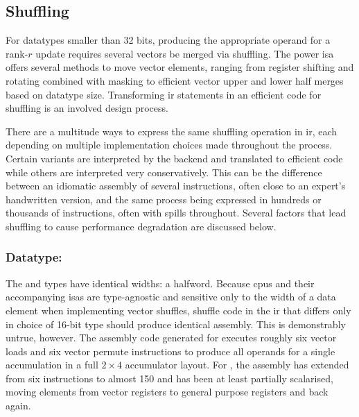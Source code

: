 \documentclass[\main/thesis.tex]{subfiles}
\begin{document}
\subsection{Shuffling}
For datatypes smaller than 32 bits, producing the appropriate operand for a rank-$r$ update requires several vectors be merged via shuffling.
The \gls{power} \gls{isa} offers several methods to move vector elements, ranging from register shifting and rotating combined with masking to efficient vector upper and lower half merges based on datatype size.
Transforming \gls{ir} statements in an efficient code for shuffling is an involved design process.

There are a multitude ways to express the same shuffling operation in \gls{ir}, each depending on multiple implementation choices made throughout the process.
Certain variants are interpreted by the backend and translated to efficient code while others are interpreted very conservatively.
This can be the difference between an idiomatic assembly of several instructions, often close to an expert's handwritten version, and the same process being expressed in hundreds or thousands of instructions, often with \glspl{spill} throughout.
Several factors that lead shuffling to cause performance degradation are discussed below.

\subsubsection{Datatype: \texorpdfstring{}{half}}
The  and  types have identical widths: a halfword.
Because \glspl{cpu} and their accompanying \glspl{isa} are type-agnostic and sensitive only to the width of a data element when implementing vector shuffles, shuffle code in the \gls{ir} that differs only in choice of 16-bit type should produce identical assembly.
This is demonstrably untrue, however.
The assembly code generated for  executes roughly six vector loads and six vector permute instructions to produce all operands for a single accumulation in a full $2 \times 4$ accumulator layout.
For , the assembly has extended from six instructions to almost 150 and has been at least partially scalarised, moving elements from vector registers to general purpose registers and back again.
\end{document}
